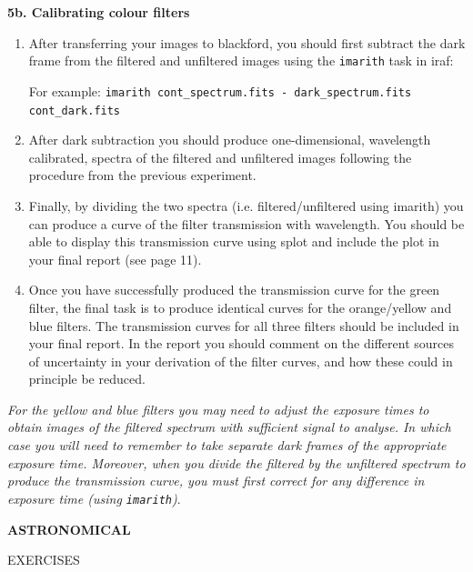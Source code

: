 \documentclass[12pt]{article}
\begin{document}
{\bf 5b. Calibrating colour filters}

\begin{enumerate}

\item After transferring your images to blackford, you should first subtract the dark frame from the filtered and unfiltered images using the {\tt imarith} task in {\sc iraf}:

   For example: {\tt \verb,imarith cont_spectrum.fits - dark_spectrum.fits cont_dark.fits,}

\item After dark subtraction you should produce one-dimensional, wavelength calibrated, spectra of the filtered and unfiltered images following the procedure from the previous experiment.

\item Finally, by dividing the two spectra (i.e. filtered/unfiltered using {\sc imarith}) you can produce a curve of the filter transmission with wavelength. You should be able to display this transmission curve using {\sc splot} and include the plot in your final report (see page 11).

\item Once you have successfully produced the transmission curve for the green filter, the final task is to produce identical curves for the orange/yellow and blue filters. The transmission curves for all three filters should be included in your final report. In the report you should comment on the different sources of uncertainty in your derivation of the filter curves, and how these could in principle be reduced.

\end{enumerate}

{\it For the yellow and blue filters you may need to adjust the exposure times to obtain images of the filtered spectrum with sufficient signal to analyse. In which case you will need to remember to take separate dark frames of the appropriate exposure time. Moreover, when you divide the filtered by the unfiltered spectrum to produce the transmission curve, you must first correct for any difference in exposure time (using {\tt imarith})}.

\newpage

\pagestyle{empty}
\vspace*{6cm}

\begin{center}
{\Large\bf ASTRONOMICAL

EXERCISES}
\end{center}
\end{document}
